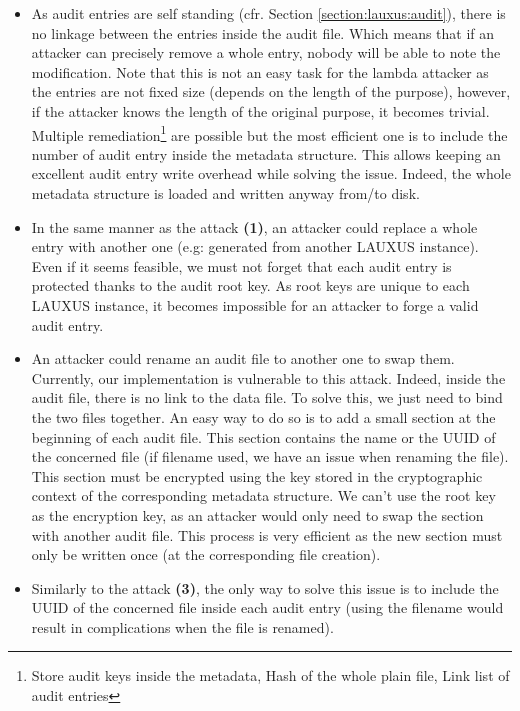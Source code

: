 \documentclass[../main.tex]{subfiles}
\begin{document}
\begin{itemize}
    \item[\textbf{(1)}] As audit entries are self standing (cfr. Section \ref{section:lauxus:audit}), there is no linkage between the entries inside the audit file. Which means that if an attacker can precisely remove a whole entry, nobody will be able to note the modification. Note that this is not an easy task for the lambda attacker as the entries are not fixed size (depends on the length of the purpose), however, if the attacker knows the length of the original purpose, it becomes trivial. Multiple remediation\footnote{Store audit keys inside the metadata, Hash of the whole plain file, Link list of audit entries} are possible but the most efficient one is to include the number of audit entry inside the metadata structure. This allows keeping an excellent audit entry write overhead while solving the issue. Indeed, the whole metadata structure is loaded and written anyway from/to disk.
    \item[\textbf{(2)}] In the same manner as the attack \textbf{(1)}, an attacker could replace a whole entry with another one (e.g: generated from another LAUXUS instance). Even if it seems feasible, we must not forget that each audit entry is protected thanks to the audit root key. As root keys are unique to each LAUXUS instance, it becomes impossible for an attacker to forge a valid audit entry.
    \item[\textbf{(3)}] An attacker could rename an audit file to another one to swap them. Currently, our implementation is vulnerable to this attack. Indeed, inside the audit file, there is no link to the data file. To solve this, we just need to bind the two files together. An easy way to do so is to add a small section at the beginning of each audit file. This section contains the name or the UUID of the concerned file (if filename used, we have an issue when renaming the file). This section must be encrypted using the key stored in the cryptographic context of the corresponding metadata structure. We can't use the root key as the encryption key, as an attacker would only need to swap the section with another audit file. This process is very efficient as the new section must only be written once (at the corresponding file creation).
    \item[\textbf{(4)}] Similarly to the attack \textbf{(3)}, the only way to solve this issue is to include the UUID of the concerned file inside each audit entry (using the filename would result in complications when the file is renamed).

\end{itemize}
\end{document}
